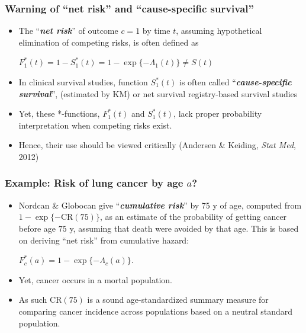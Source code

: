 \documentclass[handout,12pt,dvipsnames,t]{beamer}
\begin{document}
\begin{frame}
\frametitle{Warning of ``net risk'' and ``cause-specific survival''}

\begin{itemize}                              
\item
The ``\textbf{\textit{net risk}}'' of outcome $c=1$ by time $t$, 
assuming hypothetical elimination of competing risks,
is often defined as
\begin{center}
$ F_1^*(t) = 1 - S_1^*(t) = 1- \exp\{ - \Lambda_1(t) \} \neq S(t)$
\end{center}
\medskip
\item
In clinical survival studies, function 
$S_1^*(t)$ is often called ``\textbf{\textit{cause-specific survival}}'',
(estimated by KM) or net survival registry-based survival studies
\medskip
\item
Yet, these *-functions, $ F_1^*(t)$ and $S_1^*(t)$, lack proper probability interpretation when
 competing risks exist.
\medskip
\item
Hence, their use should be viewed critically
(Andersen \& Keiding, \textit{Stat Med}, 2012)
\end{itemize}
\end{frame}

\begin{frame}
   \frametitle{Example: Risk of lung cancer by age $a$?}

\begin{itemize}
 \item 
 Nordcan \& Globocan give 
``\textbf{\textit{cumulative risk}}'' by 75 y of age, computed from 
$1 - \exp\{-\text{CR}(75)\}$, as an estimate  of the probability of 
getting cancer before age $75$ y, 
assuming that death were avoided by that age. This is based on 
deriving ``net risk'' from cumulative hazard:
\begin{center} 
$ F_c^*(a) = 1 - \exp\{ - \Lambda_c(a) \}. $
\end{center}
\medskip
\item
Yet, cancer occurs in a mortal population.
\medskip
\item
As such CR$({75})$ is a sound age-standardized summary 
 measure for comparing cancer incidence across populations 
 based on a neutral standard population.
\end{itemize}

\end{frame}
 
\end{document}
